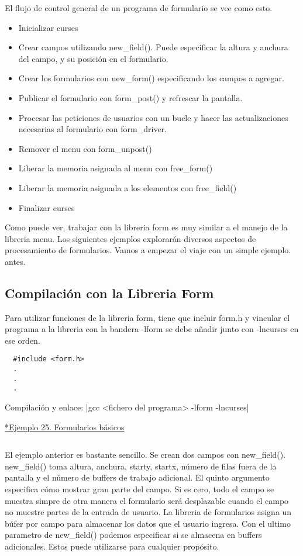 \documentclass{article}
\begin{document}
El flujo de control general de un programa de formulario se vee como esto.\\

\begin{itemize}
  \item Inicializar curses
  \item Crear campos utilizando new\_field(). Puede especificar la altura y
    anchura del campo, y su posición en el formulario.
  \item Crear los formularios con new\_form() especificando los campos a agregar.
  \item Publicar el formulario con form\_post() y refrescar la pantalla.
  \item Procesar las peticiones de usuarios con un bucle y hacer las
    actualizaciones necesarias al formulario con form\_driver.
  \item Remover el menu con form\_unpost()
  \item Liberar la memoria asignada al menu con free\_form()
  \item Liberar la memoria asignada a los elementos con free\_field()
  \item Finalizar curses
\end{itemize}

Como puede ver, trabajar con la libreria form es muy similar a el manejo de la
libreria menu. Los siguientes ejemplos explorarán diversos aspectos de
procesamiento de formularios. Vamos a empezar el viaje con un simple ejemplo.
antes.

\subsection{Compilación con la Libreria Form}%
Para utilizar funciones de la libreria form, tiene que incluir form.h y
vincular el programa a la libreria con la bandera -lform se debe añadir junto
con -lncurses en ese orden.

\begin{verbatim}
  #include <form.h>
  .
  .
  .
\end{verbatim}

Compilación y enlace:
|gcc <fichero del programa> -lform -lncurses|

\href{https://github.com/nasciiboy/NCURSES-Programming-HOWTO/blob/master/ncurses_programs/forms/form_simple.c}{*Ejemplo 25. Formularios básicos}
\inputminted{cpp}{./cpp/025_formularios_basicos.cpp}

El ejemplo anterior es bastante sencillo. Se crean dos campos con new\_field().
new\_field() toma altura, anchura, starty, startx, número de filas fuera de la
pantalla y el número de buffers de trabajo adicional. El quinto argumento
especifica cómo mostrar gran parte del campo. Si es cero, todo el campo se
muestra simpre de otra manera el formulario será desplazable cuando el campo no
muestre partes de la entrada de usuario. La libreria de formularios asigna un
búfer por campo para almacenar los datos que el usuario ingresa. Con el ultimo
parametro de new\_field() podemos especificar si se almacena en buffers
adicionales. Estos puede utilizarse ​​para cualquier propósito.\\
\end{document}
